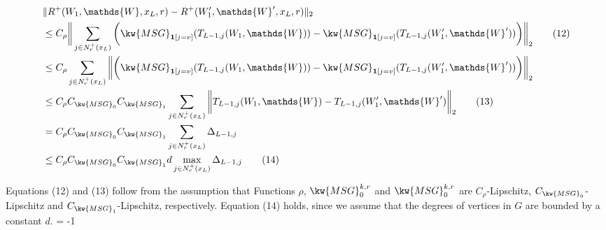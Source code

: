 

\begin{scriptsize}	
\begin{align*}
&\|R^+(W_1,\mathds{W},x_L,r)-R^+(W_1',\mathds{W}',x_L,r)\|_2\\ %
  &\leq C_\rho\bigg\|\sum_{j\in N_r^+(x_L)}\bigg(\kw{MSG}_{{\bf 1}[j=v]}(T_{L-1,j}(W_1,
  \mathds{W})) -\kw{MSG}_{{\bf 1}[j=v]}(T_{L-1,j}(W_1',\mathds{W}'))\bigg)\bigg\|_2  \tag{12}
  \\
 & \leq C_\rho\sum_{j\in N_r^+(x_L)}\bigg\|\bigg(\kw{MSG}_{{\bf 1}[j=v]}(T_{L-1,j}(W_1,
  \mathds{W})) -\kw{MSG}_{{\bf 1}[j=v]}(T_{L-1,j}(W_1',\mathds{W}'))\bigg)\bigg\|_2 \nonumber
  \\
  &\leq C_\rho C_{\kw{MSG}_0}C_{\kw{MSG}_1}\sum_{j\in N_r^+(x_L)}\bigg\|T_{L-1,j}(W_1,\mathds{W})-
  T_{L-1,j}(W_1',\mathds{W}')\bigg\|_2 \tag{13}\\
  &= C_\rho C_{\kw{MSG}_0}C_{\kw{MSG}_1}\sum_{j\in N_r^+(x_L)}\Delta_{L-1,j}\\
  &\leq C_\rho C_{\kw{MSG}_0}C_{\kw{MSG}_1}d\max_{j\in N_r^+(x_L)}\Delta_{L-1,j}\tag{14}
\end{align*}
\end{scriptsize}


Equations (12) and (13) follow from the assumption 
that Functions $\rho$, $\kw{MSG}^{k,r}_0$ and 
$\kw{MSG}^{k,r}_0$ are $C_\rho$-Lipschitz, 
$C_{\kw{MSG}_0}$-Lipschitz  and $C_{\kw{MSG}_1}$-Lipschitz,
respectively.
Equation (14) holds, since we assume that 
the degrees of vertices in $G$ are bounded by 
a constant $d$.
\looseness = -1

